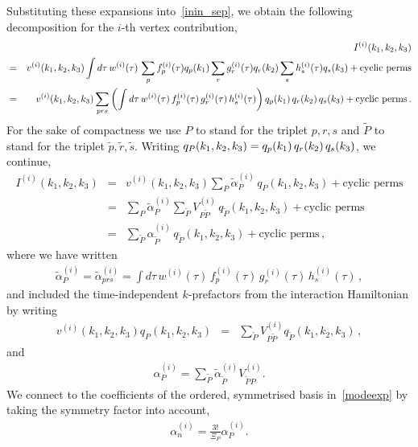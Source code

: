 Substituting these expansions into~\eqref{inin_sep}, we obtain the following decomposition for the $i$-th vertex contribution,
\begin{eqnarray}\label{inin_kdep}
    &&I^{(i)}(k_1,k_2,k_3)\nonumber\\
    &=& v^{(i)}(k_1, k_2,k_3)\int d\tau\, w^{(i)}(\tau)\, \sum_p f_p^{(i)}(\tau) q_p(k_1)\sum_r g_r^{(i)}(\tau) q_r(k_2)\sum_s h_s^{(i)}(\tau) q_s(k_3) + \text{cyclic perms}\nonumber\\	
	&=& v^{(i)}(k_1, k_2,k_3)\sum_{prs}\left(\int d\tau\, w^{(i)}(\tau)\, f_p^{(i)}(\tau)\, g_r^{(i)}(\tau) \,h_s^{(i)}(\tau)\right)q_p(k_1)\,q_r(k_2)\,q_s(k_3) + \text{cyclic perms}\nonumber\,.
\end{eqnarray}
For the sake of compactness we use $P$ to stand for the triplet $p,r,s$ and $\tilde{P}$ to stand for the triplet $\tilde{p},\tilde{r},\tilde{s}$.
Writing $q_{P}(k_1,k_2,k_3)=q_p(k_1)\,q_r(k_2)\,q_s(k_3)$,
we continue,
\begin{eqnarray}\label{inin_kdep_cont}
    I^{(i)}(k_1,k_2,k_3) & =& v^{(i)}(k_1, k_2,k_3) \sum_{P} \tilde{\alpha}_{P}^{(i)}\,  q_{P}(k_1,k_2,k_3) + \text{cyclic perms}\nonumber\\
    & =& \sum_{P} \tilde{\alpha}_{P}^{(i)}\sum_{\tilde{P}}V^{(i)}_{P\tilde{P}}\,  q_{\tilde{P}}(k_1,k_2,k_3) + \text{cyclic perms}\nonumber\\
    & =& \sum_{\tilde{P}} \alpha_{\tilde{P}}^{(i)}\,  q_{\tilde{P}}(k_1,k_2,k_3) + \text{cyclic perms} \,,
\end{eqnarray}
where we have written
\begin{eqnarray}\label{inin_kindep}
\tilde{\alpha}_P^{(i)} =  \tilde{\alpha}_{prs}^{(i)} 	= \int d\tau\, w^{(i)}(\tau)\, f_p^{(i)}(\tau) \,g_r^{(i)}(\tau) \,h_s^{(i)}(\tau)\,,
\end{eqnarray}
and included the time-independent $k$-prefactors from the interaction Hamiltonian by writing
\begin{eqnarray}\label{V_definition}
    v^{(i)}(k_1, k_2,k_3)q_P(k_1,k_2,k_3) &=& \sum_{\tilde{P}}V^{(i)}_{P\tilde{P}}q_{\tilde{P}}(k_1,k_2,k_3)\,,
\end{eqnarray}
and
\begin{eqnarray}
    \alpha_P^{(i)} = \sum_{\tilde{P}} \tilde{\alpha}_{\tilde{P}}^{(i)}V^{(i)}_{\tilde{P}P}.
\end{eqnarray}
We connect to the coefficients of the ordered, symmetrised basis in~\eqref{modeexp} by taking the symmetry factor into account,
\begin{eqnarray}
    \alpha_n^{(i)} = \frac{3!}{\Xi_P}\alpha_P^{(i)}.
\end{eqnarray}
